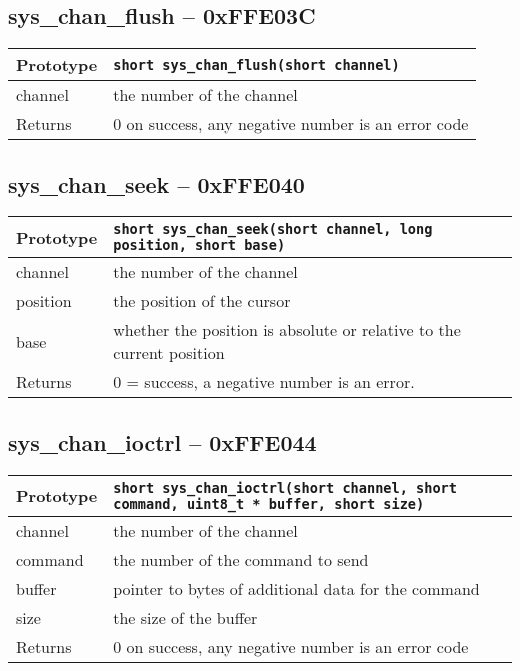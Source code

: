 \subsection*{sys\_chan\_flush -- 0xFFE03C}
\begin{tabular}{|l||l|} \hline
Prototype & \lstinline!short sys_chan_flush(short channel)! \\ \hline
channel & the number of the channel \\ \hline
Returns & 0 on success, any negative number is an error code \\ \hline
\end{tabular}

\subsection*{sys\_chan\_seek -- 0xFFE040}
\begin{tabular}{|l||l|} \hline
Prototype & \lstinline!short sys_chan_seek(short channel, long position, short base)! \\ \hline
channel & the number of the channel \\ \hline
position & the position of the cursor \\ \hline
base & whether the position is absolute or relative to the current position \\ \hline
Returns & 0 = success, a negative number is an error. \\ \hline
\end{tabular}

\subsection*{sys\_chan\_ioctrl -- 0xFFE044}
\begin{tabular}{|l||l|} \hline
Prototype & \lstinline!short sys_chan_ioctrl(short channel, short command, uint8_t * buffer, short size)! \\ \hline
channel & the number of the channel \\ \hline
command & the number of the command to send \\ \hline
buffer & pointer to bytes of additional data for the command \\ \hline
size & the size of the buffer \\ \hline
Returns & 0 on success, any negative number is an error code \\ \hline
\end{tabular}

